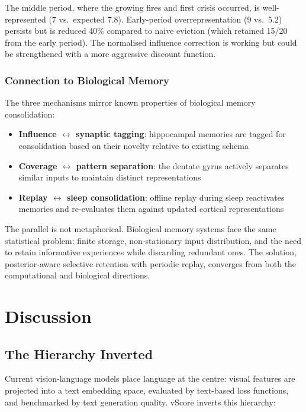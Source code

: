 \documentclass[11pt]{article}
\begin{document}
The middle period, where the growing fires and first crisis occurred, is well-represented (7 vs.\ expected 7.8). Early-period overrepresentation (9 vs.\ 5.2) persists but is reduced 40\% compared to naive eviction (which retained 15/20 from the early period). The normalised influence correction is working but could be strengthened with a more aggressive discount function.

\subsubsection{Connection to Biological Memory}

The three mechanisms mirror known properties of biological memory consolidation:

\begin{itemize}
    \item \textbf{Influence $\leftrightarrow$ synaptic tagging}: hippocampal memories are tagged for consolidation based on their novelty relative to existing schema \citep{wang2010}
    \item \textbf{Coverage $\leftrightarrow$ pattern separation}: the dentate gyrus actively separates similar inputs to maintain distinct representations \citep{leutgeb2007}
    \item \textbf{Replay $\leftrightarrow$ sleep consolidation}: offline replay during sleep reactivates memories and re-evaluates them against updated cortical representations \citep{diekelmann2010}
\end{itemize}

The parallel is not metaphorical. Biological memory systems face the same statistical problem: finite storage, non-stationary input distribution, and the need to retain informative experiences while discarding redundant ones. The solution, posterior-aware selective retention with periodic replay, converges from both the computational and biological directions.

\section{Discussion}

\subsection{The Hierarchy Inverted}

Current vision-language models place language at the centre: visual features are projected into a text embedding space, evaluated by text-based loss functions, and benchmarked by text generation quality. vScore inverts this hierarchy:
\end{document}
